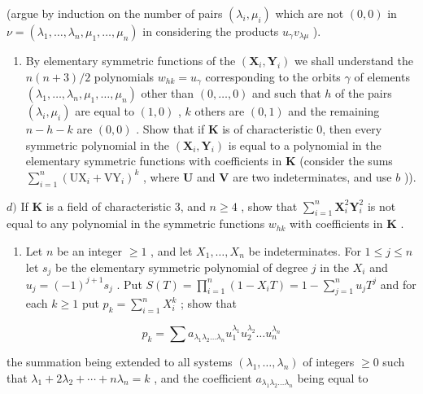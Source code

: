 (argue by induction on the number of pairs \((\lambda_i, \mu_i)\) which are not \((0, 0)\) in \(\nu = (\lambda_1, \ldots, \lambda_n, \mu_1, \ldots, \mu_n)\) in considering the products \(u_\gamma v_{\lambda \mu}\) ).

\begin{enumerate}
\def\labelenumi{\alph{enumi})}
\setcounter{enumi}{2}
\tightlist
\item
  By elementary symmetric functions of the \((\mathbf{X}_i, \mathbf{Y}_i)\) we shall understand the \(n(n + 3)/2\) polynomials \(w_{hk} = u_\gamma\) corresponding to the orbits \(\gamma\) of elements \((\lambda_1, \ldots, \lambda_n, \mu_1, \ldots, \mu_n)\) other than \((0, \ldots, 0)\) and such that \(h\) of the pairs \((\lambda_i, \mu_i)\) are equal to \((1, 0)\) , \(k\) others are \((0, 1)\) and the remaining \(n - h - k\) are \((0, 0)\) . Show that if \(\mathbf{K}\) is of characteristic 0, then every symmetric polynomial in the \((\mathbf{X}_i, \mathbf{Y}_i)\) is equal to a polynomial in the elementary symmetric functions with coefficients in \(\mathbf{K}\) (consider the sums \(\sum_{i=1}^{n} (\mathrm{UX}_i + \mathrm{VY}_i)^k\) , where \(\mathbf{U}\) and \(\mathbf{V}\) are two indeterminates, and use \(b\) )).
\end{enumerate}

\(d)\) If \(\mathbf{K}\) is a field of characteristic 3, and \(n \geqslant 4\) , show that \(\sum_{i=1}^{n} \mathbf{X}_i^2 \mathbf{Y}_i^2\) is not equal to any polynomial in the symmetric functions \(w_{hk}\) with coefficients in \(\mathbf{K}\) .

\begin{enumerate}
\def\labelenumi{\arabic{enumi})}
\setcounter{enumi}{5}
\tightlist
\item
  Let \(n\) be an integer \(\geqslant 1\) , and let \(X_1, \ldots, X_n\) be indeterminates. For \(1 \leqslant j \leqslant n\) let \(s_j\) be the elementary symmetric polynomial of degree \(j\) in the \(X_i\) and \(u_j = (-1)^{j+1} s_j\) . Put \(S(T) = \prod_{i=1}^{n} (1 - X_i T) = 1 - \sum_{j=1}^{n} u_j T^j\) and for each \(k \geqslant 1\) put \(p_k = \sum_{i=1}^{n} X_i^k\) ; show that
\end{enumerate}

\[
p _ {k} = \sum a _ {\lambda_ {1} \lambda_ {2} \dots \lambda_ {n}} u _ {1} ^ {\lambda_ {1}} u _ {2} ^ {\lambda_ {2}} \dots u _ {n} ^ {\lambda_ {n}}
\]

the summation being extended to all systems \((\lambda_{1},\ldots,\lambda_{n})\) of integers \(\geqslant0\) such that \(\lambda_{1}+2\lambda_{2}+\cdots+n\lambda_{n}=k\) , and the coefficient \(a_{\lambda_{1}\lambda_{2}\ldots\lambda_{n}}\) being equal to

